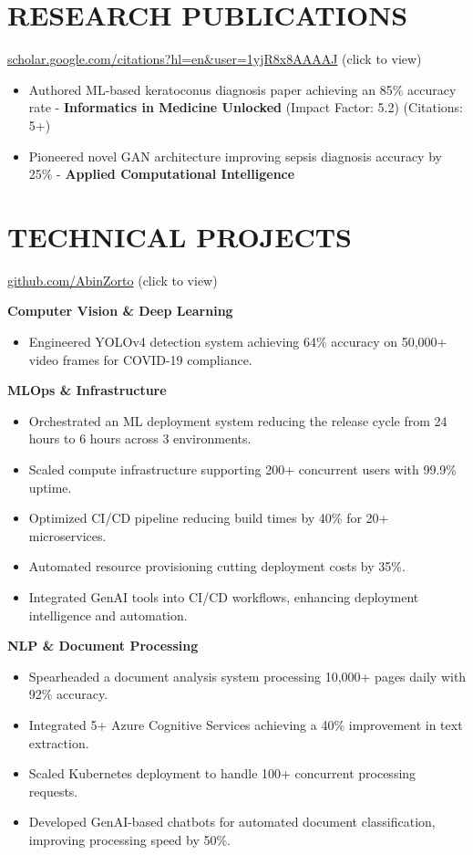 \documentclass[10pt,a4paper]{article}
\begin{document}
\section*{RESEARCH PUBLICATIONS}
\href{https://scholar.google.com/citations?hl=en&user=1yjR8x8AAAAJ}{scholar.google.com/citations?hl=en\&user=1yjR8x8AAAAJ} {\small\color{secondary}(click to view)}
\begin{itemize}
    \item Authored ML-based keratoconus diagnosis paper achieving an 85\% accuracy rate - \textbf{Informatics in Medicine Unlocked} (Impact Factor: 5.2) (Citations: 5+)
    \item Pioneered novel GAN architecture improving sepsis diagnosis accuracy by 25\% - \textbf{Applied Computational Intelligence}
\end{itemize}

\section*{TECHNICAL PROJECTS} 
\href{https://github.com/AbinZorto}{github.com/AbinZorto} {\small\color{secondary}(click to view)}

\textbf{Computer Vision \& Deep Learning}
\begin{itemize}
    \item Engineered YOLOv4 detection system achieving 64\% accuracy on 50,000+ video frames for COVID-19 compliance.
\end{itemize}

\textbf{MLOps \& Infrastructure}
\begin{itemize}
    \item Orchestrated an ML deployment system reducing the release cycle from 24 hours to 6 hours across 3 environments.
    \item Scaled compute infrastructure supporting 200+ concurrent users with 99.9\% uptime.
    \item Optimized CI/CD pipeline reducing build times by 40\% for 20+ microservices.
    \item Automated resource provisioning cutting deployment costs by 35\%.
    \item Integrated GenAI tools into CI/CD workflows, enhancing deployment intelligence and automation.
\end{itemize}

\textbf{NLP \& Document Processing}
\begin{itemize}
    \item Spearheaded a document analysis system processing 10,000+ pages daily with 92\% accuracy.
    \item Integrated 5+ Azure Cognitive Services achieving a 40\% improvement in text extraction.
    \item Scaled Kubernetes deployment to handle 100+ concurrent processing requests.
    \item Developed GenAI-based chatbots for automated document classification, improving processing speed by 50\%.
\end{itemize}
\end{document}
